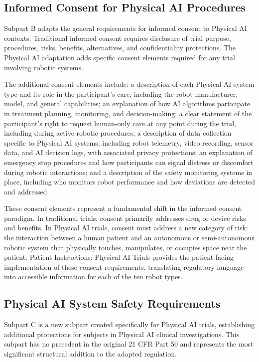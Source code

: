 \subsection{Informed Consent for Physical AI Procedures}
\label{subsec:cfr50-consent}

Subpart B adapts the general requirements for informed consent to Physical AI
contexts. Traditional informed consent requires disclosure of trial purpose,
procedures, risks, benefits, alternatives, and confidentiality protections. The
Physical AI adaptation adds specific consent elements required for any trial
involving robotic systems.

The additional consent elements include: a description of each Physical AI
system type and its role in the participant's care, including the robot
manufacturer, model, and general capabilities; an explanation of how AI
algorithms participate in treatment planning, monitoring, and decision-making;
a clear statement of the participant's right to request human-only care at any
point during the trial, including during active robotic procedures; a
description of data collection specific to Physical AI systems, including robot
telemetry, video recording, sensor data, and AI decision logs, with associated
privacy protections; an explanation of emergency stop procedures and how
participants can signal distress or discomfort during robotic interactions; and
a description of the safety monitoring systems in place, including who monitors
robot performance and how deviations are detected and addressed.

These consent elements represent a fundamental shift in the informed consent
paradigm. In traditional trials, consent primarily addresses drug or device
risks and benefits. In Physical AI trials, consent must address a new category
of risk: the interaction between a human patient and an autonomous or
semi-autonomous robotic system that physically touches, manipulates, or
occupies space near the patient. Patient Instructions: Physical AI Trials
\cite{patient-instructions-paper} provides the patient-facing implementation
of these consent requirements, translating regulatory language into accessible
information for each of the ten robot types.

\subsection{Physical AI System Safety Requirements}
\label{subsec:cfr50-safety}

Subpart C is a new subpart created specifically for Physical AI trials,
establishing additional protections for subjects in Physical AI clinical
investigations. This subpart has no precedent in the original 21 CFR Part 50
and represents the most significant structural addition to the adapted
regulation.


